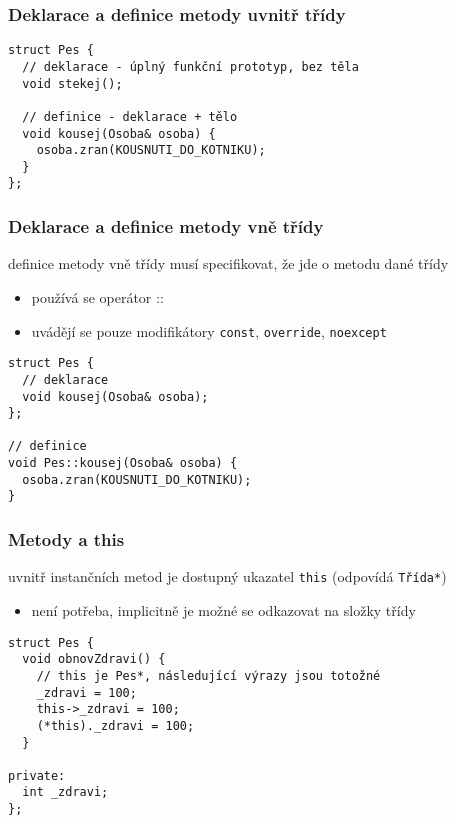 \begin{frame}[fragile]
\frametitle{Deklarace a definice metody uvnitř třídy}
\begin{yesblock}
\begin{lstlisting}
struct Pes {
  // deklarace - úplný funkční prototyp, bez těla
  void stekej();

  // definice - deklarace + tělo
  void kousej(Osoba& osoba) {
    osoba.zran(KOUSNUTI_DO_KOTNIKU);    
  }
};
\end{lstlisting}
\end{yesblock}
\end{frame}


\begin{frame}[fragile]
\frametitle{Deklarace a definice metody vně třídy}
\begin{bitemize}
\item definice metody vně třídy musí specifikovat, že jde o metodu dané třídy
\begin{itemize}
\item používá se operátor ::
\item uvádějí se pouze modifikátory \lstinline|const|, \lstinline|override|, \lstinline|noexcept|
\end{itemize}
\end{bitemize}
\begin{yesblock}
\begin{lstlisting}
struct Pes {
  // deklarace
  void kousej(Osoba& osoba);
};

// definice
void Pes::kousej(Osoba& osoba) {
  osoba.zran(KOUSNUTI_DO_KOTNIKU);   
}
\end{lstlisting}
\end{yesblock}
\end{frame}


\begin{frame}[fragile]
\frametitle{Metody a this}

\begin{bitemize}
\item uvnitř instančních metod je dostupný ukazatel \lstinline|this| (odpovídá \lstinline|Třída*|)
\begin{itemize}
\item není potřeba, implicitně je možné se odkazovat na složky třídy
\end{itemize}
\end{bitemize}

\begin{yesblock}
\begin{lstlisting}
struct Pes {
  void obnovZdravi() {
    // this je Pes*, následující výrazy jsou totožné
    _zdravi = 100;
    this->_zdravi = 100;
    (*this)._zdravi = 100;
  }

private:
  int _zdravi;
};
\end{lstlisting}
\end{yesblock}
\end{frame}


